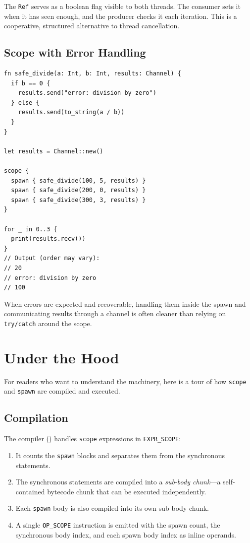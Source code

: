 The \lstinline|Ref| serves as a boolean flag visible to both threads.
The consumer sets it when it has seen enough, and the producer checks it each iteration.
This is a cooperative, structured alternative to thread cancellation.

\subsection{Scope with Error Handling}

\begin{lstlisting}[language=Lattice, caption={Handling errors from parallel tasks}]
fn safe_divide(a: Int, b: Int, results: Channel) {
  if b == 0 {
    results.send("error: division by zero")
  } else {
    results.send(to_string(a / b))
  }
}

let results = Channel::new()

scope {
  spawn { safe_divide(100, 5, results) }
  spawn { safe_divide(200, 0, results) }
  spawn { safe_divide(300, 3, results) }
}

for _ in 0..3 {
  print(results.recv())
}
// Output (order may vary):
// 20
// error: division by zero
// 100
\end{lstlisting}

When errors are expected and recoverable, handling them inside the spawn and communicating results through a channel is often cleaner than relying on \lstinline|try/catch| around the scope.

\section{Under the Hood}\label{sec:scope-spawn-internals}


For readers who want to understand the machinery, here is a tour of how \lstinline|scope| and \lstinline|spawn| are compiled and executed.

\subsection{Compilation}

The compiler () handles \lstinline|scope| expressions in \texttt{EXPR\_SCOPE}:

\begin{enumerate}
  \item It counts the \lstinline|spawn| blocks and separates them from the synchronous statements.
  \item The synchronous statements are compiled into a \emph{sub-body chunk}---a self-contained bytecode chunk that can be executed independently.
  \item Each \lstinline|spawn| body is also compiled into its own sub-body chunk.
  \item A single \lstinline|OP_SCOPE| instruction is emitted with the spawn count, the synchronous body index, and each spawn body index as inline operands.
\end{enumerate}

